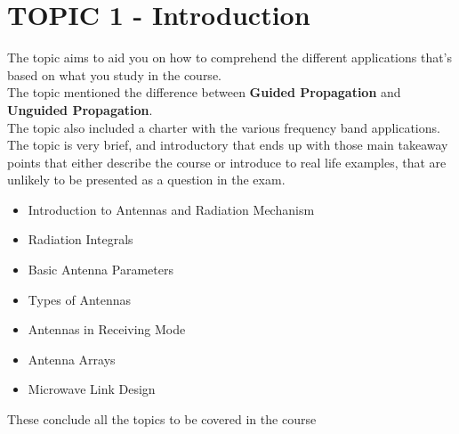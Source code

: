 \documentclass[class=article, crop=false]{standalone}
\begin{document}
    \section{TOPIC 1 - Introduction}
    The topic aims to aid you on how to comprehend the different applications that's based on what you study
    in the course\cite{ELCN405}.\\

    The topic mentioned the difference between \textbf{Guided Propagation} and \textbf{Unguided Propagation}.\\
    The topic also included a charter with the various frequency band applications. \\

    The topic is very brief, and introductory that ends up with those main takeaway points that either
    describe the course\cite{ELCN405} or introduce to real life examples, that are unlikely to be presented
    as a question in the exam. \\

    \begin{itemize}
        \item Introduction to Antennas and Radiation Mechanism
        \item Radiation Integrals
        \item Basic Antenna Parameters
        \item Types of Antennas
        \item Antennas in Receiving Mode
        \item Antenna Arrays
        \item Microwave Link Design
    \end{itemize}

    These conclude all the topics to be covered in the course\cite{ELCN405}
\end{document}

